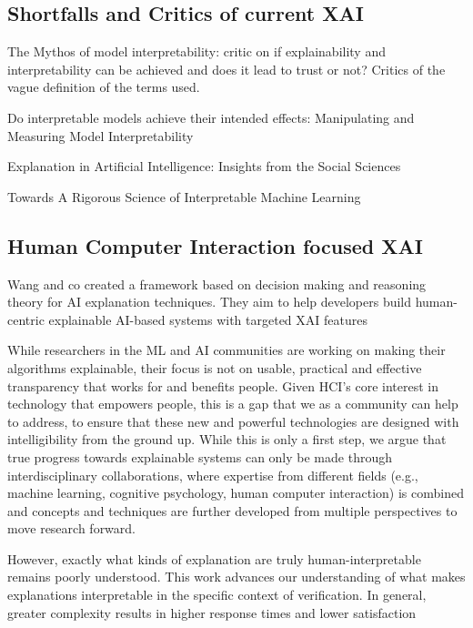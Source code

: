 \documentclass[manuscript,screen,review]{acmart}
\begin{document}
\subsection{Shortfalls and Critics of current XAI}
The Mythos of model interpretability\cite{Lipton2018}: critic on if explainability and interpretability can be achieved and does it lead to trust or not? Critics of the vague definition of the terms used.

Do interpretable models achieve their intended effects: Manipulating and Measuring Model Interpretability\cite{Goldstein2021}

Explanation in Artificial Intelligence: Insights from the Social Sciences\cite{Miller2019}

Towards A Rigorous Science of Interpretable Machine Learning\cite{Doshi-Velez2017}

\subsection{Human Computer Interaction focused XAI}\label{subsec:human-computer-interaction-focused-xai}

Wang and co created a framework based on decision making and reasoning theory for AI explanation techniques.
They aim to help developers build human-centric explainable AI-based systems with targeted XAI features\cite{Wang2019}

While researchers in the ML and AI communities are working on making their algorithms explainable, their focus is not on usable, practical and effective transparency that works for and
benefits people.
Given HCI’s core interest in technology that empowers people, this is a gap that we as a community can
help to address, to ensure that these new and powerful technologies are designed with intelligibility from the ground up.
While this is only a first step, we argue that true progress
towards explainable systems can only be made through interdisciplinary collaborations, where expertise from different
fields (e.g., machine learning, cognitive psychology, human computer interaction) is combined and concepts and techniques are further developed from multiple perspectives to
move research forward.\cite{Abdul2018}

However, exactly what kinds of explanation are truly human-interpretable remains poorly understood.
This work advances our understanding of what makes explanations interpretable in the specific context of verification.
In general, greater complexity results in higher response times and lower satisfaction\cite{Narayanan2018}
\end{document}
